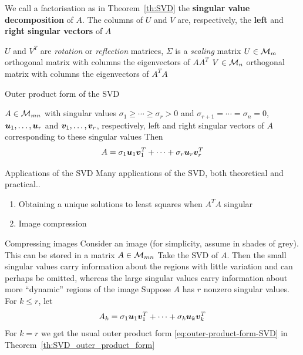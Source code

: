 \documentclass[aspectratio=169]{beamer}\usepackage[]{graphicx}\usepackage[]{xcolor}
\begin{document}
\begin{frame}
\begin{importantdefinition}
We call a factorisation as in Theorem~\ref{th:SVD} the \textbf{singular value decomposition} of $A$. The columns of $U$ and $V$ are, respectively, the \textbf{left} and \textbf{right singular vectors} of $A$
\end{importantdefinition}
\vfill
$U$ and $V^T$ are \emph{rotation} or \emph{reflection} matrices, $\Sigma$ is a \emph{scaling} matrix
\vfill
$U\in\mathcal{M}_m$ orthogonal matrix with columns the eigenvectors of $AA^T$
\vfill
$V\in\mathcal{M}_n$ orthogonal matrix with columns the eigenvectors of $A^TA$
\end{frame}


\begin{frame}{Outer product form of the SVD}
\begin{theorem}
\label{th:SVD_outer_product_form}
$A\in\mathcal{M}_{mn}$ with singular values $\sigma_1\geq\cdots\geq\sigma_r>0$ and $\sigma_{r+1}=\cdots=\sigma_n=0$, $\bm{u}_1,\ldots,\bm{u}_r$ and $\bm{v}_1,\ldots,\bm{v}_r$, respectively, left and right singular vectors of $A$ corresponding to these singular values
\vskip0.5cm
Then 
\begin{equation}\label{eq:outer-product-form-SVD}
A=\sigma_1\bm{u}_1\bm{v}_1^T+\cdots+\sigma_r\bm{u}_r\bm{v}_r^T
\end{equation}
\end{theorem}
\end{frame}



\begin{frame}{Applications of the SVD}
Many applications of the SVD, both theoretical and practical..
\vfill
\begin{enumerate}
\item Obtaining a unique solutions to least squares when $A^TA$ singular
\vfill
\item Image compression
\end{enumerate}
\end{frame}



\begin{frame}{Compressing images}
Consider an image (for simplicity, assume in shades of grey). 
This can be stored in a matrix $A\in\mathcal{M}_{mn}$
\vfill
Take the SVD of $A$. Then the small singular values carry information about the regions with little variation and can perhaps be omitted, whereas the large singular values carry information about more ``dynamic'' regions of the image
\vfill
Suppose $A$  has $r$ nonzero singular values. For $k\leq r$, let
\[
A_k = \sigma_1\bm{u}_1\bm{v}_1^T+\cdots+\sigma_k\bm{u}_k\bm{v}_k^T
\]
\vfill
For $k=r$ we get the usual outer product form \eqref{eq:outer-product-form-SVD} in Theorem~\ref{th:SVD_outer_product_form}
\end{frame}
\end{document}
